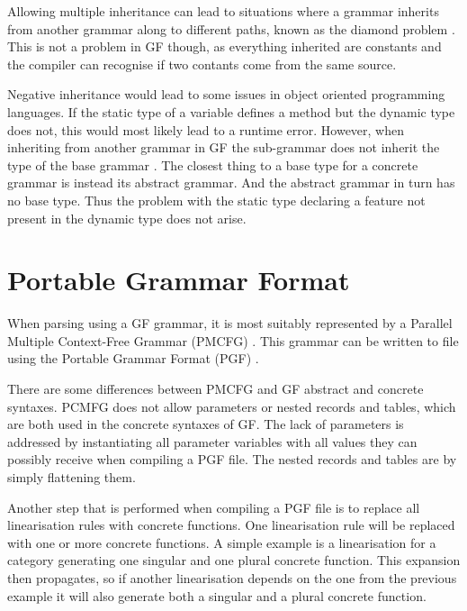 Allowing multiple inheritance can lead to situations where a grammar inherits from another grammar along to different paths, known as the diamond problem \cite{diamondproblem}. This is not a problem in GF though, as everything inherited are constants and the compiler can recognise if two contants come from the same source\cite{gf}.

Negative inheritance would lead to some issues in object oriented programming languages. If the static type of a variable defines a method but the dynamic type does not, this would most likely lead to a runtime error. However, when inheriting from another grammar in GF the sub-grammar does not inherit the type of the base grammar \cite{gf}. The closest thing to a base type for a concrete grammar is instead its abstract grammar. And the abstract grammar in turn has no base type. Thus the problem with the static type declaring a feature not present in the dynamic type does not arise.

\section{Portable Grammar Format}
When parsing using a GF grammar, it is most suitably represented by a Parallel Multiple Context-Free Grammar (PMCFG) \cite{pmcfg} \cite{pmcfg2}. This grammar can be written to file using the Portable Grammar Format (PGF) \cite{Angelov}.

There are some differences between PMCFG and GF abstract and concrete syntaxes. PCMFG does not allow parameters or nested records and tables, which are both used in the concrete syntaxes of GF. The lack of parameters is addressed by instantiating all parameter variables with all values they can possibly receive when compiling a PGF file. The nested records and tables are by simply flattening them.

Another step that is performed when compiling a PGF file is to replace all linearisation rules with concrete functions. One linearisation rule will be replaced with one or more concrete functions. A simple example is a linearisation for a category generating one singular and one plural concrete function. This expansion then propagates, so if another linearisation depends on the one from the previous example it will also generate both a singular and a plural concrete function.
